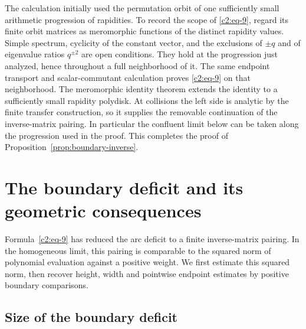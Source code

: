 The calculation initially used the permutation orbit of one sufficiently
small arithmetic progression of rapidities.  To record the scope of
\eqref{c2:eq-9}, regard its finite orbit matrices as meromorphic functions
of the distinct rapidity values.  Simple spectrum, cyclicity of the
constant vector, and the exclusions of $\pm q$ and of eigenvalue ratios
$q^{\pm2}$ are open conditions.  They hold at the progression just
analyzed, hence throughout a full neighborhood of it.  The same endpoint
transport and scalar-commutant calculation proves \eqref{c2:eq-9} on that
neighborhood.  The meromorphic identity theorem extends the identity to
a sufficiently small rapidity polydisk.  At collisions the left side is
analytic by the finite transfer construction, so it supplies the removable
continuation of the inverse-matrix pairing.  In particular the confluent
limit below can be taken along the progression used in the proof.
This completes the proof of Proposition~\ref{prop:boundary-inverse}.

\section{The boundary deficit and its geometric consequences}\label{sec:deficit}

Formula~\eqref{c2:eq-9} has reduced the arc deficit to a finite inverse-matrix pairing. In the homogeneous limit, this pairing is comparable to the squared norm of polynomial evaluation against a positive weight. We first estimate this squared norm, then recover height, width and pointwise endpoint estimates by positive boundary comparisons.
\subsection{Size of the boundary deficit}

